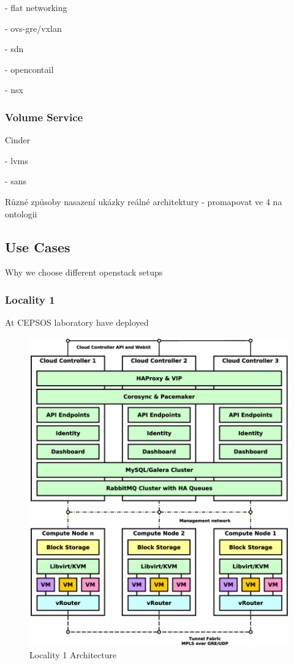 - flat networking

- ovs-gre/vxlan

- sdn

  - opencontail
  
  - nsx

\subsubsection{Volume Service}

Cinder

- lvms

- sans

Různé způsoby nasazení ukázky reálné architektury - promapovat ve 4 na ontologii

\subsection{Use Cases}

Why we choose different openstack setups

\subsubsection{Locality 1}

At CEPSOS laboratory have deployed 

\begin{figure}[!h]
\centering
\includegraphics[scale=.2]{img/use_case_ha_gre.eps}
\caption{Locality 1 Architecture}
\label{fig:cm}
\end{figure}

